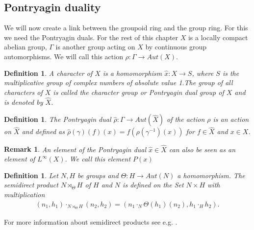 \documentclass[12pt,a4paper]{scrartcl}
\newtheorem{Definition}[Theorem]{Definition}
\newtheorem{Remark}[Theorem]{Remark}
\numberwithin{equation}{section}
\newcommand{\2}{\mathbb{Z} / 2 \mathbb{Z}}
\newcommand{\1}{\bar{1}}
\newcommand{\0}{\bar{0}}
\begin{document}
\subsection{Pontryagin duality}
We will now create a link between the groupoid ring and the group ring. For this we need the Pontryagin duals. For the rest of this chapter $X$ is a locally compact abelian group, $\Gamma$ is another group acting on $X$ by continuous group automorphisms. We will call this action $\rho: \Gamma \to Aut(X)$.
\begin{Definition}
	A character of $X$ is a homomorphism $\hat{x}: X \to S$, where $S$ is the multiplicative group of complex numbers of absolute value 1.The group of all characters of $X$ is called the character group or Pontryagin dual group of $X$ and is denoted by $\hat{X}$.
\end{Definition}
\begin{Definition}
	The Pontryagin dual $\hat{\rho}:\Gamma \to Aut(\hat{X})$ of the action $\rho$ is an action on $\hat{X}$ and defined as $\hat{\rho}(\gamma)(f)(x) = f(\rho(\gamma^{-1})(x))$ for $f \in \hat{X}$ and $x \in X$.
\end{Definition}
\begin{Remark}
	An element of the Pontryagin dual $\hat{x} \in \hat{X}$ can also be seen as an element of $L^{\infty}(X)$. We call this element $P(x)$
\end{Remark}
\begin{Definition}
	Let $N, H$ be groups and $\Theta : H \to Aut(N)$ a homomorphism. The semidirect product $N \rtimes_\Theta H$ of $H$ and $N$ is defined on the Set $N \times H$ with multiplication 
	\begin{align*}
		(n_1, h_1) \cdot_{N \rtimes_\Theta H} (n_2, h_2) = (n_1 \cdot_N \Theta(h_1)(n_2), h_1 \cdot_H h_2).
	\end{align*}
\end{Definition}
For more information about semidirect products see e.g. \cite{ALG}.
\end{document}
